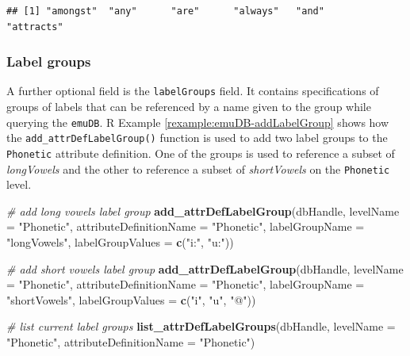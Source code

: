 \documentclass[]{book}
\newenvironment{Shaded}{\begin{snugshade}}{\end{snugshade}}
\newcommand{\CommentTok}[1]{\textcolor[rgb]{0.56,0.35,0.01}{\textit{#1}}}
\newcommand{\DataTypeTok}[1]{\textcolor[rgb]{0.13,0.29,0.53}{#1}}
\newcommand{\KeywordTok}[1]{\textcolor[rgb]{0.13,0.29,0.53}{\textbf{#1}}}
\newcommand{\NormalTok}[1]{#1}
\newcommand{\StringTok}[1]{\textcolor[rgb]{0.31,0.60,0.02}{#1}}
\theoremstyle{definition}
\theoremstyle{definition}
\theoremstyle{definition}
\theoremstyle{remark}
\begin{document}
\begin{verbatim}
## [1] "amongst"  "any"      "are"      "always"   "and"      "attracts"
\end{verbatim}

\hypertarget{label-groups}{%
\subsubsection{Label groups}\label{label-groups}}

A further optional field is the \texttt{labelGroups} field. It contains
specifications of groups of labels that can be referenced by a name
given to the group while querying the \texttt{emuDB}. R Example
\ref{rexample:emuDB-addLabelGroup} shows how the
\texttt{add\_attrDefLabelGroup()} function is used to add two label
groups to the \texttt{Phonetic} attribute definition. One of the groups
is used to reference a subset of \emph{longVowels} and the other to
reference a subset of \emph{shortVowels} on the \texttt{Phonetic} level.

\begin{Shaded}
\begin{Highlighting}[]
\CommentTok{# add long vowels label group}
\KeywordTok{add_attrDefLabelGroup}\NormalTok{(dbHandle,}
                      \DataTypeTok{levelName =} \StringTok{"Phonetic"}\NormalTok{,}
                      \DataTypeTok{attributeDefinitionName =} \StringTok{"Phonetic"}\NormalTok{,}
                      \DataTypeTok{labelGroupName =} \StringTok{"longVowels"}\NormalTok{,}
                      \DataTypeTok{labelGroupValues =} \KeywordTok{c}\NormalTok{(}\StringTok{"i:"}\NormalTok{, }\StringTok{"u:"}\NormalTok{))}

\CommentTok{# add short vowels label group}
\KeywordTok{add_attrDefLabelGroup}\NormalTok{(dbHandle,}
                      \DataTypeTok{levelName =} \StringTok{"Phonetic"}\NormalTok{,}
                      \DataTypeTok{attributeDefinitionName =} \StringTok{"Phonetic"}\NormalTok{,}
                      \DataTypeTok{labelGroupName =} \StringTok{"shortVowels"}\NormalTok{,}
                      \DataTypeTok{labelGroupValues =} \KeywordTok{c}\NormalTok{(}\StringTok{"i"}\NormalTok{, }\StringTok{"u"}\NormalTok{, }\StringTok{"@"}\NormalTok{))}


\CommentTok{# list current label groups}
\KeywordTok{list_attrDefLabelGroups}\NormalTok{(dbHandle,}
                        \DataTypeTok{levelName =} \StringTok{"Phonetic"}\NormalTok{,}
                        \DataTypeTok{attributeDefinitionName =} \StringTok{"Phonetic"}\NormalTok{)}
\end{Highlighting}
\end{Shaded}
\end{document}
